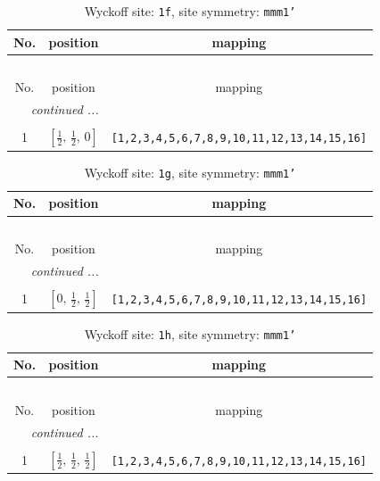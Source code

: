 \documentclass[fleqn,8pt]{jsarticle}
\begin{document}
\renewcommand{\arraystretch}{1.2}
\begin{longtable}{ccc}
\caption{Wyckoff site: {\tt 1f}, site symmetry: {\tt mmm1'}}
 \\
 \hline \hline
No. & position & mapping \\ \hline \endfirsthead

\multicolumn{2}{l}{\tablename\ \thetable{}} \\
 \hline \hline
No. & position & mapping \\ \hline \endhead

 \hline \hline
\multicolumn{2}{r}{\footnotesize\it continued ...} \\ \endfoot

 \hline \hline
\multicolumn{2}{r}{} \\ \endlastfoot

1 & $\left[ \frac{1}{2},\, \frac{1}{2},\, 0 \right]$ & {\tt [1,2,3,4,5,6,7,8,9,10,11,12,13,14,15,16]} \\
\end{longtable}
\renewcommand{\arraystretch}{1.2}
\begin{longtable}{ccc}
\caption{Wyckoff site: {\tt 1g}, site symmetry: {\tt mmm1'}}
 \\
 \hline \hline
No. & position & mapping \\ \hline \endfirsthead

\multicolumn{2}{l}{\tablename\ \thetable{}} \\
 \hline \hline
No. & position & mapping \\ \hline \endhead

 \hline \hline
\multicolumn{2}{r}{\footnotesize\it continued ...} \\ \endfoot

 \hline \hline
\multicolumn{2}{r}{} \\ \endlastfoot

1 & $\left[ 0,\, \frac{1}{2},\, \frac{1}{2} \right]$ & {\tt [1,2,3,4,5,6,7,8,9,10,11,12,13,14,15,16]} \\
\end{longtable}
\renewcommand{\arraystretch}{1.2}
\begin{longtable}{ccc}
\caption{Wyckoff site: {\tt 1h}, site symmetry: {\tt mmm1'}}
 \\
 \hline \hline
No. & position & mapping \\ \hline \endfirsthead

\multicolumn{2}{l}{\tablename\ \thetable{}} \\
 \hline \hline
No. & position & mapping \\ \hline \endhead

 \hline \hline
\multicolumn{2}{r}{\footnotesize\it continued ...} \\ \endfoot

 \hline \hline
\multicolumn{2}{r}{} \\ \endlastfoot

1 & $\left[ \frac{1}{2},\, \frac{1}{2},\, \frac{1}{2} \right]$ & {\tt [1,2,3,4,5,6,7,8,9,10,11,12,13,14,15,16]} \\
\end{longtable}
\end{document}
